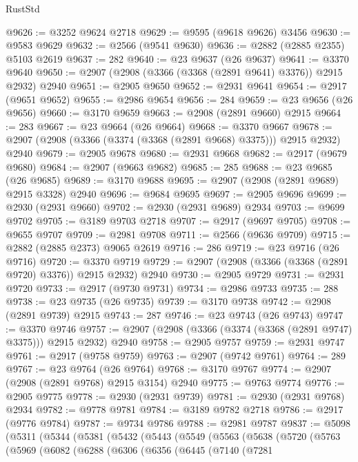 \begin{lexlean}{RustStd}
\begin{coremodule}
@9626 := @3252 @9624 @2718
@9629 := @9595 (@9618 @9626) @3456
@9630 := @9583 @9629
@9632 := @2566 (@9541 @9630)
@9636 := @2882 (@2885 @2355) @5103 @2619
@9637 := 282
@9640 := @23 @9637 (@26 @9637)
@9641 := @3370 @9640
@9650 := @2907 (@2908 (@3366 (@3368 (@2891 @9641) @3376)) @2915 @2932) @2940
@9651 := @2905 @9650
@9652 := @2931 @9641
@9654 := @2917 (@9651 @9652)
@9655 := @2986 @9654
@9656 := 284
@9659 := @23 @9656 (@26 @9656)
@9660 := @3170 @9659
@9663 := @2908 (@2891 @9660) @2915
@9664 := 283
@9667 := @23 @9664 (@26 @9664)
@9668 := @3370 @9667
@9678 := @2907 (@2908 (@3366 (@3374 (@3368 (@2891 @9668) @3375))) @2915 @2932) @2940
@9679 := @2905 @9678
@9680 := @2931 @9668
@9682 := @2917 (@9679 @9680)
@9684 := @2907 (@9663 @9682)
@9685 := 285
@9688 := @23 @9685 (@26 @9685)
@9689 := @3170 @9688
@9695 := @2907 (@2908 (@2891 @9689) @2915 @3328) @2940
@9696 := @9684 @9695
@9697 := @2905 @9696
@9699 := @2930 (@2931 @9660)
@9702 := @2930 (@2931 @9689) @2934
@9703 := @9699 @9702
@9705 := @3189 @9703 @2718
@9707 := @2917 (@9697 @9705)
@9708 := @9655 @9707
@9709 := @2981 @9708
@9711 := @2566 (@9636 @9709)
@9715 := @2882 (@2885 @2373) @9065 @2619
@9716 := 286
@9719 := @23 @9716 (@26 @9716)
@9720 := @3370 @9719
@9729 := @2907 (@2908 (@3366 (@3368 (@2891 @9720) @3376)) @2915 @2932) @2940
@9730 := @2905 @9729
@9731 := @2931 @9720
@9733 := @2917 (@9730 @9731)
@9734 := @2986 @9733
@9735 := 288
@9738 := @23 @9735 (@26 @9735)
@9739 := @3170 @9738
@9742 := @2908 (@2891 @9739) @2915
@9743 := 287
@9746 := @23 @9743 (@26 @9743)
@9747 := @3370 @9746
@9757 := @2907 (@2908 (@3366 (@3374 (@3368 (@2891 @9747) @3375))) @2915 @2932) @2940
@9758 := @2905 @9757
@9759 := @2931 @9747
@9761 := @2917 (@9758 @9759)
@9763 := @2907 (@9742 @9761)
@9764 := 289
@9767 := @23 @9764 (@26 @9764)
@9768 := @3170 @9767
@9774 := @2907 (@2908 (@2891 @9768) @2915 @3154) @2940
@9775 := @9763 @9774
@9776 := @2905 @9775
@9778 := @2930 (@2931 @9739)
@9781 := @2930 (@2931 @9768) @2934
@9782 := @9778 @9781
@9784 := @3189 @9782 @2718
@9786 := @2917 (@9776 @9784)
@9787 := @9734 @9786
@9788 := @2981 @9787
@9837 := @5098
    (@5311
      (@5344
        (@5381
          (@5432
            (@5443
              (@5549
                (@5563
                  (@5638
                    (@5720
                      (@5763
                        (@5969
                          (@6082
                            (@6288
                              (@6306
                                (@6356
                                  (@6445
                                    (@7140
                                      (@7281

\end{coremodule}
\end{lexlean}
